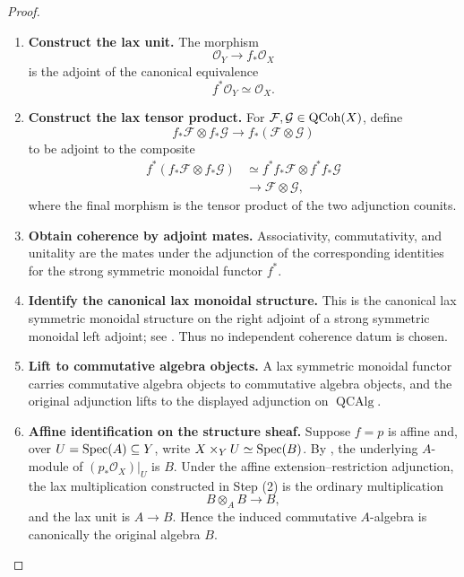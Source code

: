\begin{proof}
\leavevmode
\begin{enumerate}[label=\textup{(\arabic*)}]
    \item \textbf{Construct the lax unit.}
    The morphism
    \[
        \mathcal O_Y\longrightarrow f_*\mathcal O_X
    \]
    is the adjoint of the canonical equivalence
    \[
        f^*\mathcal O_Y\simeq\mathcal O_X.
    \]

    \item \textbf{Construct the lax tensor product.}
    For \(\mathcal F,\mathcal G\in\operatorname{QCoh}(X)\), define
    \[
        f_*\mathcal F\otimes f_*\mathcal G
        \longrightarrow
        f_*(\mathcal F\otimes\mathcal G)
    \]
    to be adjoint to the composite
    \[
    \begin{aligned}
        f^*(f_*\mathcal F\otimes f_*\mathcal G)
        &\simeq
        f^*f_*\mathcal F\otimes f^*f_*\mathcal G
        \\
        &\longrightarrow
        \mathcal F\otimes\mathcal G,
    \end{aligned}
    \]
    where the final morphism is the tensor product of the two adjunction
    counits.

    \item \textbf{Obtain coherence by adjoint mates.}
    Associativity, commutativity, and unitality are the mates under the
    adjunction of the corresponding identities for the strong symmetric
    monoidal functor \(f^*\).

    \item \textbf{Identify the canonical lax monoidal structure.}
    This is the canonical lax symmetric monoidal
    structure on the right adjoint of a strong symmetric monoidal left
    adjoint; see \cite{LurieHigherAlgebra}. Thus no independent coherence
    datum is chosen.

    \item \textbf{Lift to commutative algebra objects.}
    A lax symmetric monoidal functor carries commutative algebra objects to
    commutative algebra objects, and the original adjunction lifts to the
    displayed adjunction on \(\operatorname{QCAlg}\).

    \item \textbf{Affine identification on the structure sheaf.}
    Suppose \(f=p\) is affine and, over \(U=\operatorname{Spec}(A)\subseteq Y\), write
    \(X\times_YU\simeq\operatorname{Spec}(B)\). By
    , the underlying
    \(A\)-module of \((p_*\mathcal O_X)|_U\) is \(B\). Under the affine
    extension--restriction adjunction, the lax multiplication constructed in
    Step \textup{(2)} is the ordinary multiplication
    \[
        B\otimes_AB\longrightarrow B,
    \]
    and the lax unit is \(A\to B\). Hence the induced commutative
    \(A\)-algebra is canonically the original algebra \(B\).
\end{enumerate}
\end{proof}


